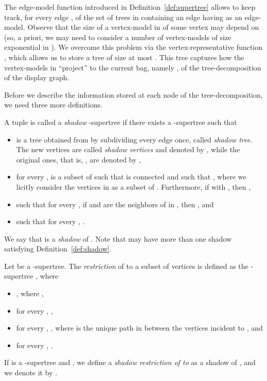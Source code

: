 \vspace{-.15cm}
The edge-model function  introduced in Definition~\ref{def:supertree} allows to keep track, for every edge , of the set of trees in  containing an edge having  as an edge-model.
Observe that the size of a vertex-model  in  of some vertex  may depend on  (so, a priori,  we may need to consider a number of vertex-models of size exponential in ). We overcome this problem via the vertex-representative function , which allows us to store a tree  of size at most . This tree  captures how the vertex-models in  ``project'' to the current bag, namely , of the tree-decomposition of the display graph.








Before we describe the information stored at each node of the tree-decomposition, we need three more definitions.

\begin{definition}\label{def:shadow}
A tuple  is called a \emph{shadow} -supertree
if there exists a -supertree  such that
\begin{itemize}
\item[]  is a tree obtained from  by subdividing every edge once, called \emph{shadow tree}. The new vertices are called \emph{shadow vertices} and denoted by , while the original ones, that is, , are denoted by ,
\item[] for every ,  is a subset of  such that  is connected and such that , where we licitly consider the vertices in   as a subset of . Furthermore, if  with , then ,
\item[]  such that for every , if  and  are the neighbors of  in , then , and
\item[]  such that for every , .
\end{itemize}
\end{definition}

We say that  is a \emph{shadow} of . Note that  may have more than one shadow satisfying Definition~\ref{def:shadow}.

\begin{definition}\label{def:restriction}
Let  be a -supertree. The \emph{restriction} of  to a subset of vertices   is defined as the -supertree , where
\begin{itemize}
\item[]  , where ,
\item[] for every , ,
\item[]  for every , , where  is the unique path in  between the vertices incident to , and
\item[]  for every , .
\end{itemize}
If  is a -supertree and , we define a \emph{shadow restriction of  to } as a shadow of , and we denote it by
 .
 \end{definition}

